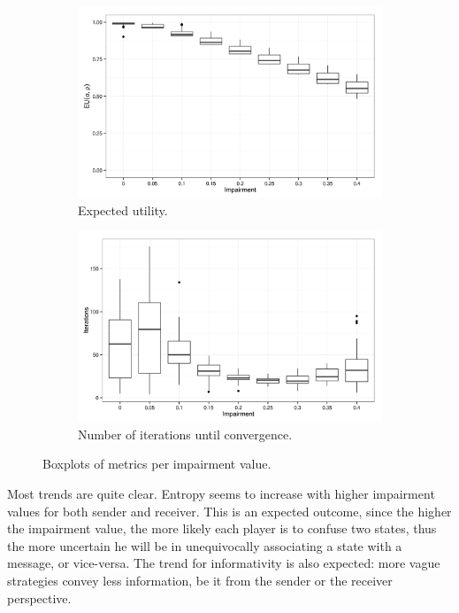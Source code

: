 \begin{figure}
        \begin{subfigure}{0.45\textwidth}
                \includegraphics[width=\textwidth]{plots/Expected-utility-20140121-141158}
                \caption{Expected utility.}
        \end{subfigure}
        \begin{subfigure}{0.45\textwidth}
                \includegraphics[width=\textwidth]{plots/Iterations-20140121-141158}
                \caption{Number of iterations until convergence.}
        \end{subfigure}
        \caption{Boxplots of metrics per impairment value.}
        \label{fig:metrics-boxplots}
\end{figure}
%
Most trends are quite clear.
Entropy seems to increase with higher impairment values for both sender and receiver.
This is an expected outcome, since the higher the impairment value, the more likely each player is to confuse two states, thus the more uncertain he will be in unequivocally associating a state with a message, or vice-versa.
The trend for informativity is also expected: more vague strategies convey less information, be it from the sender or the receiver perspective.

